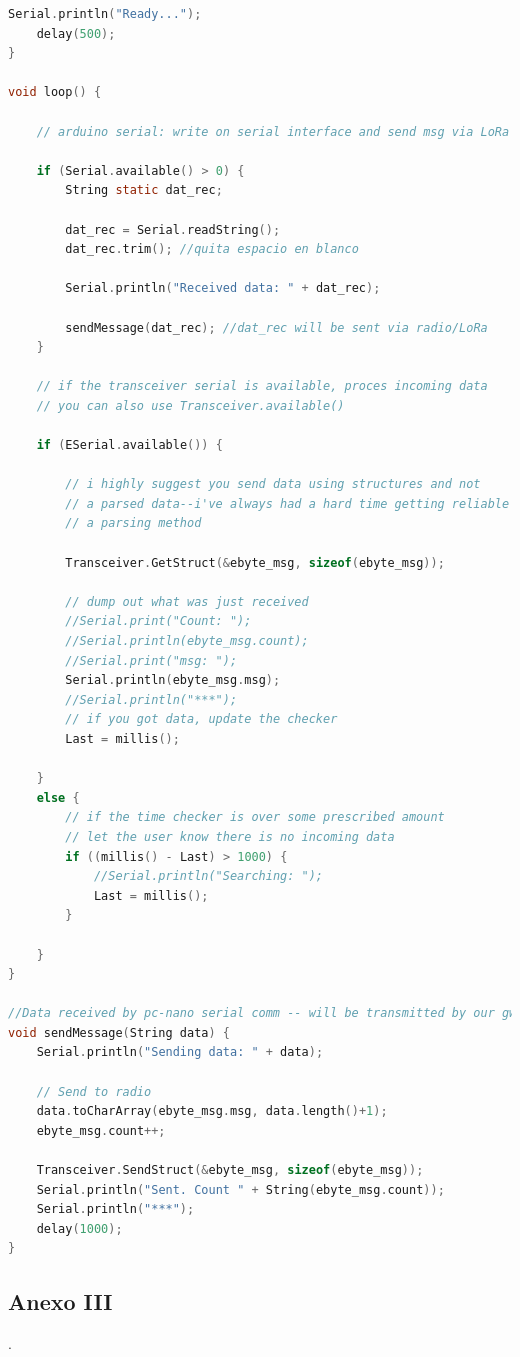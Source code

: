 \documentclass[12pt]{article}
\begin{document}
\begin{lstlisting}[language=C]
	Serial.println("Ready...");
	delay(500);
}

void loop() {
	
	// arduino serial: write on serial interface and send msg via LoRa to refugio station
	
	if (Serial.available() > 0) {
		String static dat_rec;
		
		dat_rec = Serial.readString();
		dat_rec.trim(); //quita espacio en blanco
		
		Serial.println("Received data: " + dat_rec);
		
		sendMessage(dat_rec); //dat_rec will be sent via radio/LoRa
	}
	
	// if the transceiver serial is available, proces incoming data
	// you can also use Transceiver.available()
	
	if (ESerial.available()) {
		
		// i highly suggest you send data using structures and not
		// a parsed data--i've always had a hard time getting reliable data using
		// a parsing method
		
		Transceiver.GetStruct(&ebyte_msg, sizeof(ebyte_msg));
		
		// dump out what was just received
		//Serial.print("Count: "); 
		//Serial.println(ebyte_msg.count);
		//Serial.print("msg: "); 
		Serial.println(ebyte_msg.msg);
		//Serial.println("***");
		// if you got data, update the checker
		Last = millis();
		
	}
	else {
		// if the time checker is over some prescribed amount
		// let the user know there is no incoming data
		if ((millis() - Last) > 1000) {
			//Serial.println("Searching: ");
			Last = millis();
		}
		
	}
}

//Data received by pc-nano serial comm -- will be transmitted by our gw LoRa transceiver
void sendMessage(String data) {
	Serial.println("Sending data: " + data);
	
	// Send to radio
	data.toCharArray(ebyte_msg.msg, data.length()+1);
	ebyte_msg.count++; 
	
	Transceiver.SendStruct(&ebyte_msg, sizeof(ebyte_msg));
	Serial.println("Sent. Count " + String(ebyte_msg.count));
	Serial.println("***");
	delay(1000);
}
	\end{lstlisting}

	\pagebreak
	
	\subsection*{Anexo III}
	\label{anexo III: presupuesto}
	
	. \\
	
	\pagebreak
	
\end{document}
